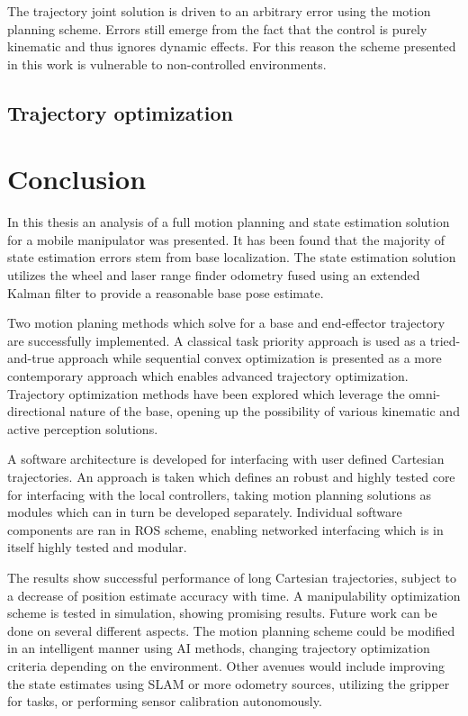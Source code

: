 \documentclass[times, utf8, diplomski, english]{fer}
\begin{document}
The trajectory joint solution is driven to an arbitrary error using the motion planning scheme.
Errors still emerge from the fact that the control is purely kinematic and thus ignores dynamic effects.
For this reason the scheme presented in this work is vulnerable to non-controlled environments.

\section{Trajectory optimization}
\chapter{Conclusion}
In this thesis an analysis of a full motion planning and state estimation solution for a mobile manipulator was presented.
It has been found that the majority of state estimation errors stem from base localization.
The state estimation solution utilizes the wheel and laser range finder odometry fused using an extended Kalman filter to provide a reasonable base pose estimate. 

Two motion planing methods which solve for a base and end-effector trajectory are successfully implemented.
A classical task priority approach is used as a tried-and-true approach while sequential convex optimization is presented as a more contemporary approach which enables advanced trajectory optimization.
Trajectory optimization methods have been explored which leverage the omni-directional nature of the base, opening up the possibility of various kinematic and active perception solutions.

A software architecture is developed for interfacing with user defined Cartesian trajectories.
An approach is taken which defines an robust and highly tested core for interfacing with the local controllers, taking motion planning solutions as modules which can in turn be developed separately.
Individual software components are ran in ROS scheme, enabling networked interfacing which is in itself highly tested and modular.

The results show successful performance of long Cartesian trajectories, subject to a decrease of position estimate accuracy with time.
A manipulability optimization scheme is tested in simulation, showing promising results.
Future work can be done on several different aspects.
The motion planning scheme could be modified in an intelligent manner using AI methods, changing trajectory optimization criteria depending on the environment.
Other avenues would include improving the state estimates using SLAM or more odometry sources, utilizing the gripper for tasks, or performing sensor calibration autonomously.
\end{document}
